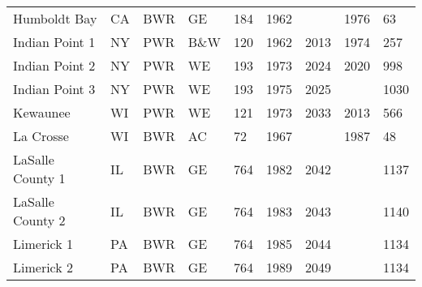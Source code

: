\begin{table}[H]
\begin{tabular}{l l l l l l l l l}
    Humboldt Bay          &CA & BWR & GE   & 184 & 1962 &      & 1976 & 63  \\
    Indian Point 1        &NY & PWR & B\&W & 120 & 1962 & 2013 & 1974 & 257 \\
    Indian Point 2        &NY & PWR & WE   & 193 & 1973 & 2024 & 2020 & 998 \\
    Indian Point 3        &NY & PWR & WE   & 193 & 1975 & 2025 &      & 1030\\
    Kewaunee              &WI & PWR & WE   & 121 & 1973 & 2033 & 2013 & 566 \\
    La Crosse           & WI & BWR & AC   & 72  & 1967 &      & 1987 & 48  \\
    LaSalle County 1    & IL & BWR & GE   & 764 & 1982 & 2042 &      & 1137\\
    LaSalle County 2    & IL & BWR & GE   & 764 & 1983 & 2043 &      & 1140\\
    Limerick 1          & PA & BWR & GE   & 764 & 1985 & 2044 &      & 1134\\
    Limerick 2          & PA & BWR & GE   & 764 & 1989 & 2049 &      & 1134\\
    \hline
    \end{tabular}
\end{table}

